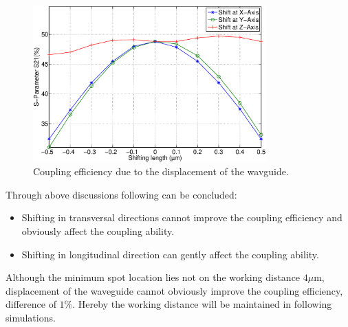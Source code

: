 \begin{figure}[!ht]
\centering
\includegraphics[width=0.8\textwidth]{bilder/shift_curve}
\caption{Coupling efficiency due to the displacement of the wavguide.}
\label{fig:shift_curve}
\end{figure}

Through above discussions following can be concluded:
\begin{itemize} 
\item Shifting in transversal directions cannot improve the coupling efficiency and obviously affect the coupling ability. 
\item Shifting in longitudinal direction can gently affect the coupling ability. 
\end{itemize}
Although the minimum spot location lies not on the working distance $4\mu$m, displacement of the waveguide cannot obviously improve the coupling efficiency, difference of $1\%$. Hereby the working distance will be maintained in following simulations.\\
